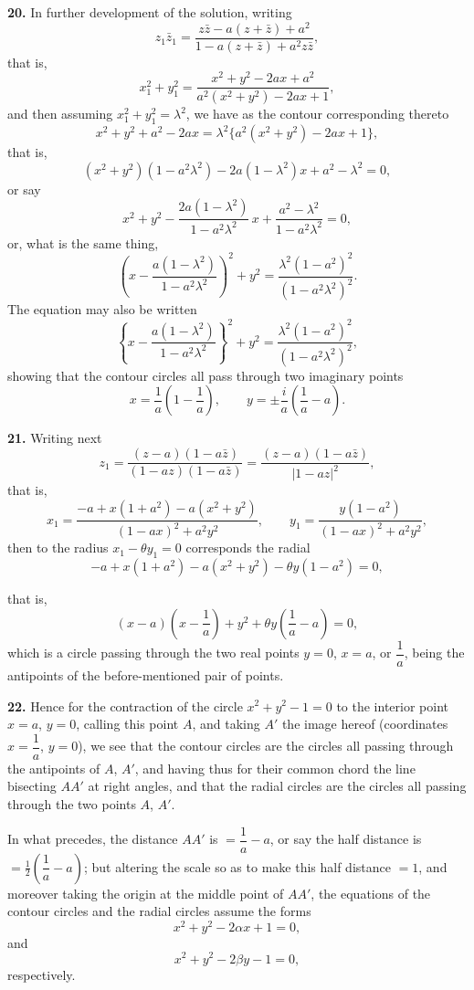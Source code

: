 \documentclass[11pt,a4paper]{article}
\begin{document}
\textbf{20.} In further development of the solution, writing
\[
z_1\bar{z}_1 = \frac{z\bar{z} - a(z + \bar{z}) + a^2}{1 - a(z + \bar{z}) + a^2 z\bar{z}},
\]
that is,
\[
x_1^2 + y_1^2 = \frac{x^2 + y^2 - 2ax + a^2}{a^2(x^2 + y^2) - 2ax + 1},
\]
and then assuming $x_1^2 + y_1^2 = \lambda^2$, we have as the contour corresponding thereto
\[
x^2 + y^2 + a^2 - 2ax = \lambda^2\{a^2(x^2 + y^2) - 2ax + 1\},
\]
that is,
\[
(x^2 + y^2)(1 - a^2\lambda^2) - 2a(1 - \lambda^2)x + a^2 - \lambda^2 = 0,
\]
or say
\[
x^2 + y^2 - \frac{2a(1 - \lambda^2)}{1 - a^2\lambda^2}\,x + \frac{a^2 - \lambda^2}{1 - a^2\lambda^2} = 0,
\]
or, what is the same thing,
\[
\left(x - \frac{a(1 - \lambda^2)}{1 - a^2\lambda^2}\right)^2 + y^2 = \frac{\lambda^2(1 - a^2)^2}{(1 - a^2\lambda^2)^2}.
\]
The equation may also be written
\[
\left\{x - \frac{a(1 - \lambda^2)}{1 - a^2\lambda^2}\right\}^2 + y^2 = \frac{\lambda^2(1 - a^2)^2}{(1 - a^2\lambda^2)^2},
\]
showing that the contour circles all pass through two imaginary points
\[
x = \frac{1}{a}\left(1 - \frac{1}{a}\right), \qquad y = \pm \frac{i}{a}\left(\frac{1}{a} - a\right).
\]

\textbf{21.} Writing next
\[
z_1 = \frac{(z - a)(1 - a\bar{z})}{(1 - a z)(1 - a\bar{z})} = \frac{(z - a)(1 - a\bar{z})}{|1 - az|^2},
\]
that is,
\[
x_1 = \frac{-a + x(1 + a^2) - a(x^2 + y^2)}{(1 - ax)^2 + a^2 y^2}, \qquad y_1 = \frac{y(1 - a^2)}{(1 - ax)^2 + a^2 y^2},
\]
then to the radius $x_1 - \theta y_1 = 0$ corresponds the radial
\[
-a + x(1 + a^2) - a(x^2 + y^2) - \theta y(1 - a^2) = 0,
\]

that is,
\[
(x - a)\left(x - \frac{1}{a}\right) + y^2 + \theta y\left(\frac{1}{a} - a\right) = 0,
\]
which is a circle passing through the two real points $y = 0$, $x = a$, or $\dfrac{1}{a}$, being the antipoints of the before-mentioned pair of points.

\textbf{22.} Hence for the contraction of the circle $x^2 + y^2 - 1 = 0$ to the interior point $x = a$, $y = 0$, calling this point $A$, and taking $A'$ the image hereof (coordinates $x = \dfrac{1}{a}$, $y = 0$), we see that the contour circles are the circles all passing through the antipoints of $A$, $A'$, and having thus for their common chord the line bisecting $AA'$ at right angles, and that the radial circles are the circles all passing through the two points $A$, $A'$.

In what precedes, the distance $AA'$ is $= \dfrac{1}{a} - a$, or say the half distance is $= \tfrac{1}{2}\left(\dfrac{1}{a} - a\right)$; but altering the scale so as to make this half distance $= 1$, and moreover taking the origin at the middle point of $AA'$, the equations of the contour circles and the radial circles assume the forms
\[
x^2 + y^2 - 2\alpha x + 1 = 0,
\]
and
\[
x^2 + y^2 - 2\beta y - 1 = 0,
\]
respectively.
\end{document}
